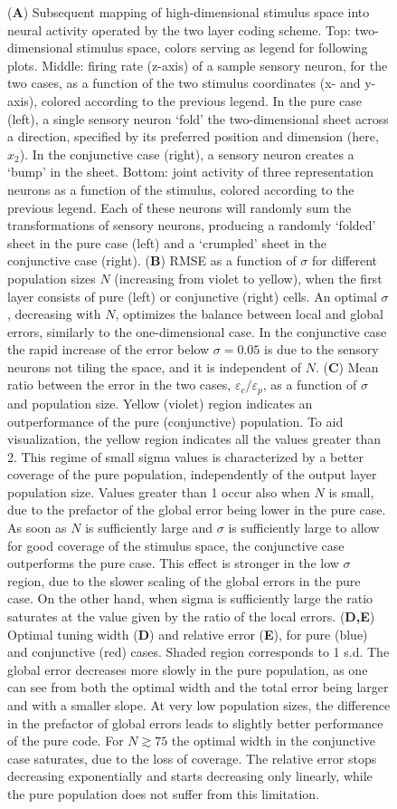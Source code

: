 \documentclass[a4paper]{article}%
\begin{document}
\begin{figure}[t]
\captionsetup{labelformat=adja-page} \ContinuedFloat
\caption[Figure]{ 
(\textbf{A}) Subsequent mapping of high-dimensional stimulus space into neural activity operated by the two layer coding scheme. Top: two-dimensional stimulus space, colors serving as legend for following plots. Middle: firing rate (z-axis) of a sample sensory neuron, for the two cases, as a function of the two stimulus coordinates (x- and y- axis), colored according to the previous legend. In the pure case (left), a single sensory neuron `fold' the two-dimensional sheet across a direction, specified by its preferred position and dimension (here, $x_2$). In the conjunctive case (right), a sensory neuron creates a `bump' in the sheet. 
Bottom: joint activity of three representation neurons as a function of the stimulus, colored according to the previous legend. Each of these neurons will randomly sum the transformations of sensory neurons, producing a randomly `folded' sheet in the pure case (left) and a `crumpled' sheet in the conjunctive case (right).
(\textbf{B}) RMSE as a function of $\sigma$ for different
population sizes $N$ (increasing from violet to yellow), when the first layer
consists of pure (left) or conjunctive (right) cells. An optimal $\sigma$, decreasing with $N$, optimizes the balance
between local and global errors, similarly to the one-dimensional case. In the
conjunctive case the rapid increase of the error below $\sigma=0.05$ is due to
the sensory neurons not tiling the space, and it is independent of $N$.
(\textbf{C}) Mean ratio between the
error in the two cases, $\varepsilon_{c}/\varepsilon_{p}$, as a function of
$\sigma$ and population size. Yellow (violet) region indicates an
outperformance of the pure (conjunctive) population. To aid
visualization, the yellow region indicates all the values greater than 2. This regime of small sigma values is characterized by a better coverage of the pure population, independently of the output layer population size.
Values greater than 1 occur also when $N$ is small, due to the
prefactor of the global error being lower in the pure case. As soon as $N$ is
sufficiently large and $\sigma$ is sufficiently large to allow for good coverage of the stimulus space, the
conjunctive case outperforms the pure case. This effect is stronger in the low
$\sigma$ region, due to the slower scaling of the global errors in the pure
case. On the other hand, when sigma is sufficiently large the ratio saturates at the value given by the ratio
of the local errors.
(\textbf{D,E}) Optimal tuning width (\textbf{D})  and relative error (\textbf{E}), for pure (blue) and conjunctive (red)
cases. Shaded region corresponds to 1 s.d. The global
error decreases more slowly in the pure population, as one can see from both
the optimal width and the total error being larger and with a smaller slope. At very
low population sizes, the difference in the prefactor of global errors
leads to slightly better performance of the pure code. For  $N \gtrsim 75 $ the optimal width in the conjunctive case saturates, due to the loss of coverage. The relative error
stops decreasing exponentially and starts decreasing only linearly, while the
pure population does not suffer from this limitation. }
\label{Fig:5}
\end{figure}
\end{document}
